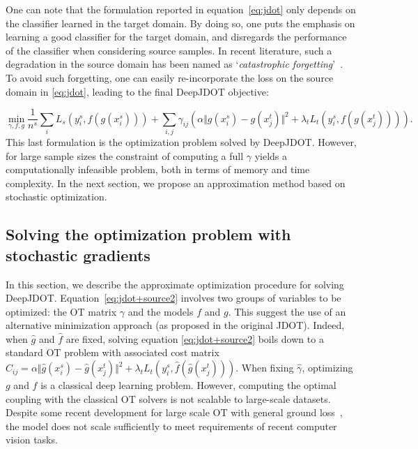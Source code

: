\documentclass[runningheads]{llncs}
\begin{document}
One can note that the formulation reported in equation~\eqref{eq:jdot} only depends on the classifier learned in the target domain. By doing so, one puts the emphasis on learning a good classifier for the target domain, and disregards the performance of the classifier when considering source samples. In recent literature, such a degradation in the source domain has been named as `\emph{catastrophic forgetting}'~\cite{Shm17,Li18}. To avoid such forgetting, one can easily re-incorporate the loss on the source domain in \eqref{eq:jdot}, leading to the final DeepJDOT objective:

 \begin{equation}
  \min_{\gamma, f,g} \frac{1}{n^s}\sum_i L_s\left(y_i^s, f(g(x_i^s))\right) + \sum_{i,j} \gamma_{ij} \left(\alpha \Vert g(x_i^s) - g(x_j^t) \Vert^2 + \lambda_t L_t\left(y_i^s,f(g(x_j^t))\right) \right).
  \label{eq:jdot+source2}
  \end{equation}
This last formulation is the optimization problem solved by DeepJDOT. However, for large sample sizes the constraint of computing a full $\gamma$ yields a computationally infeasible problem, both in terms of memory and time complexity. In the next section, we propose an approximation method based on stochastic optimization.


\subsection{Solving the optimization problem with stochastic gradients}
\label{sec:}
In this section, we describe the {approximate} optimization procedure for solving DeepJDOT. {Equation~\eqref{eq:jdot+source2} involves} two groups of variables to be optimized: the OT matrix $\gamma$ and the models $f$ and $g$. This suggest the use of an alternative minimization approach (as proposed in the original JDOT). 
Indeed,  when $\hat{g}$ and $\hat{f}$ are fixed, solving equation \eqref{eq:jdot+source2} boils down to {a standard} OT problem with associated cost matrix $C_{ij} = \alpha \Vert \hat{g}(x_i^s) - \hat{g}(x_j^t) \Vert^2 + \lambda_t  L_t\left(y_i^s,\hat{f}(\hat{g}(x_j^t))\right)$. When fixing $\hat{\gamma}$, optimizing $g$ and $f$ is a classical deep learning problem. 
However, computing the optimal coupling with the classical OT solvers is not scalable to large-scale datasets. Despite some recent development for large scale OT with general ground loss~\cite{genevay2016,seguy2018}, the model does not scale sufficiently to meet requirements of recent computer vision tasks.
\end{document}
